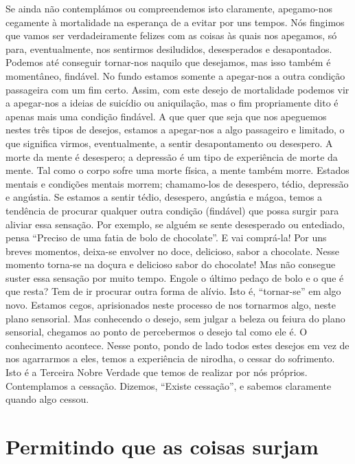 Se ainda não contemplámos ou compreendemos isto claramente, apegamo-nos cegamente à mortalidade na esperança
de a evitar por uns tempos. Nós fingimos que vamos ser
verdadeiramente felizes com as coisas às quais nos apegamos,
só para, eventualmente, nos sentirmos desiludidos, desesperados e desapontados. Podemos até conseguir tornar-nos naquilo
que desejamos, mas isso também é momentâneo, findável. No
fundo estamos somente a apegar-nos a outra condição
passageira com um fim certo. Assim, com este desejo de
mortalidade podemos vir a apegar-nos a ideias de suicídio ou
aniquilação, mas o fim propriamente dito é apenas mais uma
condição findável. A que quer que seja que nos apeguemos
nestes três tipos de desejos, estamos a apegar-nos a algo
passageiro e limitado, o que significa virmos, eventualmente,
a sentir desapontamento ou desespero.
A morte da mente é desespero; a depressão é um tipo de
experiência de morte da mente. Tal como o corpo sofre uma
morte física, a mente também morre. Estados mentais e
condições mentais morrem; chamamo-los de desespero, tédio,
depressão e angústia. Se estamos a sentir tédio, desespero,
angústia e mágoa, temos a tendência de procurar qualquer outra
condição (findável) que possa surgir para aliviar essa sensação.
Por exemplo, se alguém se sente desesperado ou entediado, pensa “Preciso de uma fatia de bolo de chocolate”. E vai
comprá-la! Por uns breves momentos, deixa-se envolver no
doce, delicioso, sabor a chocolate. Nesse momento torna-se
na doçura e delicioso sabor do chocolate! Mas não consegue
suster essa sensação por muito tempo. Engole o último
pedaço de bolo e o que é que resta? Tem de ir procurar outra
forma de alívio. Isto é, “tornar-se” em algo novo.
Estamos cegos, aprisionados neste processo de nos tornarmos algo, neste plano sensorial. Mas conhecendo o desejo,
sem julgar a beleza ou feiura do plano sensorial, chegamos ao
ponto de percebermos o desejo tal como ele é. O conhecimento
acontece. Nesse ponto, pondo de lado todos estes desejos em
vez de nos agarrarmos a eles, temos a experiência de nirodha,
o cessar do sofrimento. Isto é a Terceira Nobre Verdade que
temos de realizar por nós próprios. Contemplamos a cessação.
Dizemos, “Existe cessação”, e sabemos claramente quando
algo cessou.

\section{Permitindo que as coisas surjam}

